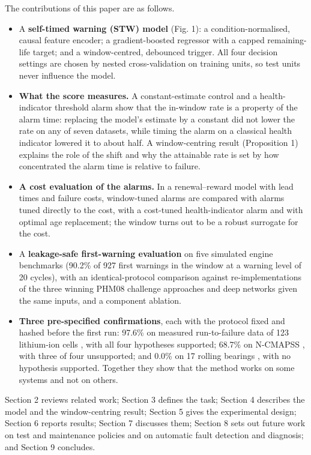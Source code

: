 \documentclass[a4paper,fleqn,doubleblind]{cas-dc}
\begin{document}
The contributions of this paper are as follows.

\begin{itemize}[leftmargin=1.2em,itemsep=2pt]
\item[(i)] A \textbf{self-timed warning (STW) model} (Fig. 1): a condition-normalised, causal feature encoder; a gradient-boosted regressor with a capped remaining-life target; and a window-centred, debounced trigger. All four decision settings are chosen by nested cross-validation on training units, so test units never influence the model.
\item[(ii)] \textbf{What the score measures.} A constant-estimate control and a health-indicator threshold alarm show that the in-window rate is a property of the alarm time: replacing the model's estimate by a constant did not lower the rate on any of seven datasets, while timing the alarm on a classical health indicator lowered it to about half. A window-centring result (Proposition 1) explains the role of the shift and why the attainable rate is set by how concentrated the alarm time is relative to failure.
\item[(iii)] \textbf{A cost evaluation of the alarms.} In a renewal--reward model with lead times and failure costs, window-tuned alarms are compared with alarms tuned directly to the cost, with a cost-tuned health-indicator alarm and with optimal age replacement; the window turns out to be a robust surrogate for the cost.
\item[(iv)] A \textbf{leakage-safe first-warning evaluation} on five simulated engine benchmarks (90.2\% of 927 first warnings in the window at a warning level of 20 cycles), with an identical-protocol comparison against re-implementations of the three winning PHM08 challenge approaches and deep networks given the same inputs, and a component ablation.
\item[(v)] \textbf{Three pre-specified confirmations}, each with the protocol fixed and hashed before the first run: 97.6\% on measured run-to-failure data of 123 lithium-ion cells \cite{severson2019}, with all four hypotheses supported; 68.7\% on N-CMAPSS \cite{ariaschao2021}, with three of four unsupported; and 0.0\% on 17 rolling bearings \cite{nectoux2012}, with no hypothesis supported. Together they show that the method works on some systems and not on others.
\end{itemize}

Section 2 reviews related work; Section 3 defines the task; Section 4 describes the model and the window-centring result; Section 5 gives the experimental design; Section 6 reports results; Section 7 discusses them; Section 8 sets out future work on test and maintenance policies and on automatic fault detection and diagnosis; and Section 9 concludes.
\end{document}
